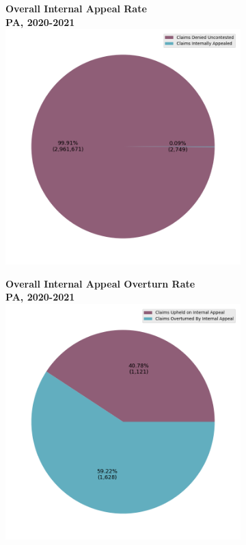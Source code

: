 \documentclass[12pt, a4paper,twoside,parskip=full]{report}
\theoremstyle{plain} %
\theoremstyle{definition} %
\theoremstyle{remark} %
\numberwithin{equation}{chapter}
\begin{document}
		\begin{figure}[h!]
			\centering
			\begin{subfigure}[b]{0.49\textwidth}
				\centering
				\textbf{Overall Internal Appeal Rate}\\
				\textbf{PA, 2020-2021}\\
				\includegraphics[width=\textwidth]{images/pa_claims/internal_appeal_pie.png}
			\end{subfigure}
			\hfill
			\begin{subfigure}[b]{0.49\textwidth}
				\centering
				\textbf{Overall Internal Appeal Overturn Rate}\\
				\textbf{PA, 2020-2021}\\
				\includegraphics[width=\textwidth]{images/pa_claims/internal_appeal_overturns_pie.png}

\end{subfigure}
\end{figure}
\end{document}
